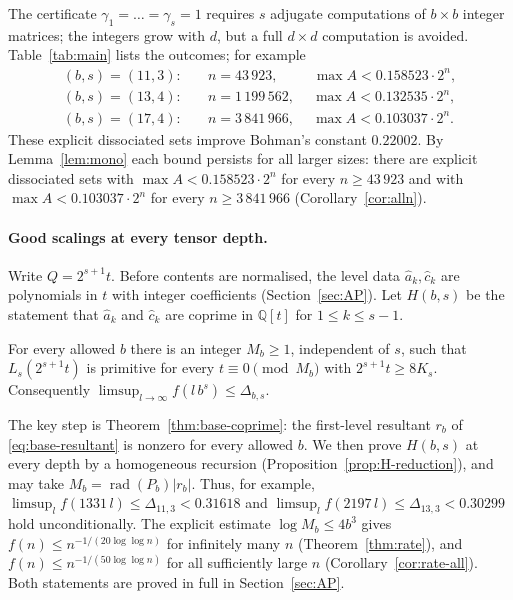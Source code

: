 \documentclass[12pt]{article}
\newcommand{\Q}{\mathbb{Q}}
\newcommand{\rad}{\operatorname{rad}}
\begin{document}
The certificate $\gamma_1=\dots=\gamma_s=1$ requires $s$ adjugate computations of $b\times b$ integer matrices; the
integers grow with $d$, but a full $d\times d$ computation is avoided. Table~\ref{tab:main} lists the outcomes; for example
\begin{align*}
 (b,s)=(11,3):\quad & n=43\,923,\qquad\ \ \max A<0.158523\cdot2^{n},\\
 (b,s)=(13,4):\quad & n=1\,199\,562,\quad\ \max A<0.132535\cdot2^{n},\\
 (b,s)=(17,4):\quad & n=3\,841\,966,\quad\ \max A<0.103037\cdot2^{n}.
\end{align*}
These explicit dissociated sets improve Bohman's constant $0.22002$. By
Lemma~\ref{lem:mono} each bound persists for all larger sizes: there are explicit dissociated sets with
$\max A<0.158523\cdot2^{n}$ for every $n\ge43\,923$ and with $\max A<0.103037\cdot2^{n}$ for every $n\ge3\,841\,966$
(Corollary~\ref{cor:alln}).

\paragraph{Good scalings at every tensor depth.} Write $Q=2^{s+1}t$. Before contents are normalised, the level data
$\hat a_k,\hat c_k$ are polynomials in $t$ with integer coefficients (Section~\ref{sec:AP}). Let $H(b,s)$ be the
statement that $\hat a_k$ and $\hat c_k$ are coprime in $\Q[t]$ for $1\le k\le s-1$.

\begin{theorem}\label{thm:AP-intro}
For every allowed $b$ there is an integer $M_b\ge1$, independent of $s$, such that $L_s(2^{s+1}t)$ is primitive for every $t\equiv0\pmod {M_b}$ with
$2^{s+1}t\ge8K_s$. Consequently $\limsup_{l\to\infty}f(l\,b^s)\le\Delta_{b,s}$.
\end{theorem}

The key step is Theorem~\ref{thm:base-coprime}: the first-level resultant $r_b$ of \eqref{eq:base-resultant} is nonzero
for every allowed $b$. We then prove $H(b,s)$ at every depth by a homogeneous recursion
(Proposition~\ref{prop:H-reduction}), and may take $M_b=\rad(P_b)|r_b|$. Thus, for example,
$\limsup_lf(1331\,l)\le\Delta_{11,3}<0.31618$ and $\limsup_lf(2197\,l)\le\Delta_{13,3}<0.30299$ hold unconditionally.
The explicit estimate $\log M_b\le4b^3$ gives
$f(n)\le n^{-1/(20\log\log n)}$ for infinitely many $n$ (Theorem~\ref{thm:rate}), and
$f(n)\le n^{-1/(50\log\log n)}$ for all sufficiently large $n$ (Corollary~\ref{cor:rate-all}). Both statements are
proved in full in Section~\ref{sec:AP}.
\end{document}

